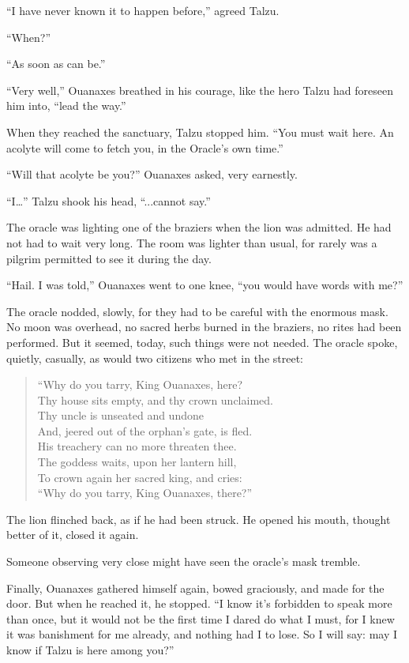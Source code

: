 ``I have never known it to happen before,'' agreed Talzu.

``When?''

``As soon as can be.''

``Very well,'' Ouanaxes breathed in his courage, like the hero Talzu had foreseen him into, ``lead the way.''

When they reached the sanctuary, Talzu stopped him. ``You must wait here. An acolyte will come to fetch you, in the Oracle's own time.''

``Will that acolyte be you?'' Ouanaxes asked, very earnestly.

``I\ldots'' Talzu shook his head, ``...cannot say.''

\secdiv

\noindent The oracle was lighting one of the braziers when the lion was admitted. He had not had to wait very long. The room was lighter than usual, for rarely was a pilgrim permitted to see it during the day.

``Hail. I was told,'' Ouanaxes went to one knee, ``you would have words with me?''

The oracle nodded, slowly, for they had to be careful with the enormous mask. No moon was overhead, no sacred herbs burned in the braziers, no rites had been performed. But it seemed, today, such things were not needed. The oracle spoke, quietly, casually, as would two citizens who met in the street:

\begin{verse}
``Why do you tarry, King Ouanaxes, here? \\
Thy house sits empty, and thy crown unclaimed. \\
Thy uncle is unseated and undone \\
And, jeered out of the orphan's gate, is fled. \\
His treachery can no more threaten thee. \\
The goddess waits, upon her lantern hill, \\
To crown again her sacred king, and cries:\\
``Why do you tarry, King Ouanaxes, there?''
\end{verse}

The lion flinched back, as if he had been struck. He opened his mouth, thought better of it, closed it again.

Someone observing very close might have seen the oracle's mask tremble.

Finally, Ouanaxes gathered himself again, bowed graciously, and made for the door. But when he reached it, he stopped. ``I know it's forbidden to speak more than once, but it would not be the first time I dared do what I must, for I knew it was banishment for me already, and nothing had I to lose. So I will say: may I know if Talzu is here among you?''

